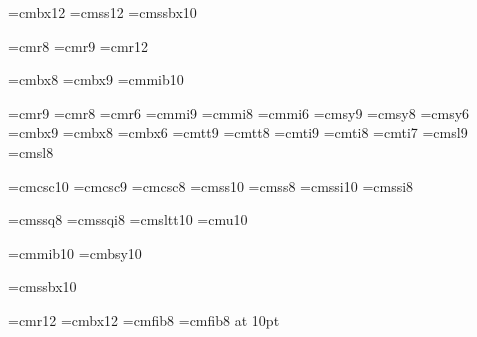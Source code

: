 
\font\bigbold=cmbx12
\font\bigsans=cmss12
\font\smallheader=cmssbx10 %

\font\eightpt=cmr8
\font\ninept=cmr9
\font\twelvept=cmr12

\font\eightbold=cmbx8
\font\ninebold=cmbx9
\font\mathbold=cmmib10

\font\ninerm=cmr9     \font\eightrm=cmr8   \font\sixrm=cmr6      %
\font\ninei=cmmi9     \font\eighti=cmmi8   \font\sixi=cmmi6      %
\font\ninesy=cmsy9    \font\eightsy=cmsy8  \font\sixsy=cmsy6     %
\font\ninebf=cmbx9    \font\eightbf=cmbx8  \font\sixbf=cmbx6     %
\font\ninett=cmtt9    \font\eighttt=cmtt8                        %
\font\nineit=cmti9    \font\eightit=cmti8  \font\sevenit=cmti7   %
\font\ninesl=cmsl9    \font\eightsl=cmsl8                        %

\font\tensc=cmcsc10   \font\ninesc=cmcsc9  \font\eightsc=cmcsc8  %
\font\tenss=cmss10    \font\eightss=cmss8    %
\font\tenssi=cmssi10  \font\eightssi=cmssi8  %

\font\eightssq=cmssq8  \font\eightssqi=cmssqi8  %
\font\tensltt=cmsltt10 %
\font\tenu=cmu10       %

\font\tenbi=cmmib10    %
\font\tenbsy=cmbsy10   %

\font\tenssbx=cmssbx10 %

\font\twelverm=cmr12  \font\twelvebf=cmbx12
\font\eightfib=cmfib8  \font\tenfib=cmfib8 at 10pt
\def\sc{\tensc}  \def\mc{\ninerm}

% 

